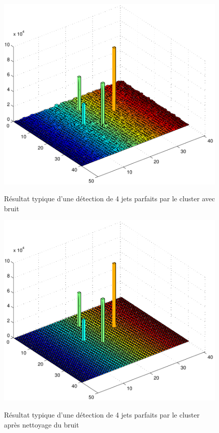 \documentclass[11pt]{article}
\begin{document}
\begin{figure}[p]
\caption{Résultat typique d'une détection de 4 jets parfaits par le cluster avec
bruit}
\includegraphics[scale=0.55]{images/bonCasBrut-eps-converted-to.pdf}
\label{bonb}
\end{figure}
\begin{figure}[p]
\caption{Résultat typique d'une détection de 4 jets parfaits par le cluster
après nettoyage du bruit}
\includegraphics[scale=0.55]{images/bonCasNet-eps-converted-to.pdf}
\label{bonp}
\end{figure}
\end{document}
